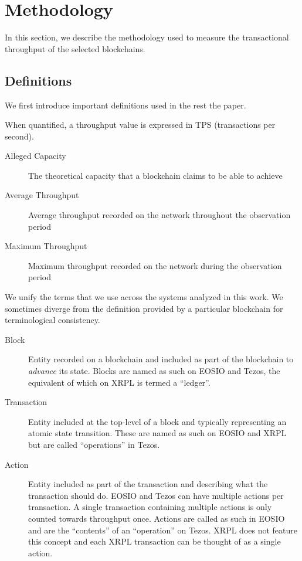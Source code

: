 
\section{Methodology}
\label{sec:methodology}
In this section, we describe the methodology used to measure the transactional throughput of the selected blockchains.

\subsection{Definitions}
We first introduce important definitions used in the rest the paper.

When quantified, a throughput value is expressed in TPS (transactions per second).
\begin{description}
\item[Alleged Capacity] The theoretical capacity that a blockchain claims to be able to achieve
\item[Average Throughput] Average throughput recorded on the network throughout the observation period
\item[Maximum Throughput] Maximum throughput recorded on the network during the observation period
\end{description}

We unify the terms that we use across the systems analyzed in this work.
We sometimes diverge from the definition provided by a particular blockchain for terminological consistency.

\begin{description}
\item[Block] Entity recorded on a blockchain and included as part of the blockchain to \emph{advance} its state. Blocks are named as such on EOSIO and Tezos, the equivalent of which on XRPL is termed  a ``ledger''.
\item[Transaction] Entity included at the top-level of a block and typically representing an atomic state transition. These are named as such on EOSIO and XRPL but are called ``operations'' in Tezos.
\item[Action] Entity included as part of the transaction and describing what the transaction should do. EOSIO and Tezos can have multiple actions per transaction. A single transaction containing multiple actions is only counted towards throughput once.
Actions are called as such in EOSIO and are the ``contents'' of an ``operation'' on Tezos. XRPL does not feature this concept and each XRPL transaction can be thought of as a single action.
\end{description}


